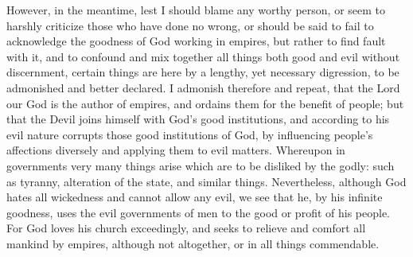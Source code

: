 However, in the meantime, lest I should blame any worthy person, or seem to harshly criticize those who have done no wrong, or should be said to fail to acknowledge the goodness of God working in empires, but rather to find fault with it, and to confound and mix together all things both good and evil without discernment, certain things are here by a lengthy, yet necessary digression, to be admonished and better declared. I admonish therefore and repeat, that the Lord our God is the author of empires, and ordains them for the benefit of people; but that the Devil joins himself with God’s good institutions, and according to his evil nature corrupts those good institutions of God, by influencing people’s affections diversely and applying them to evil matters. Whereupon in governments very many things arise which are to be disliked by the godly: such as tyranny, alteration of the state, and similar things. Nevertheless, although God hates all wickedness and cannot allow any evil, we see that he, by his infinite goodness, uses the evil governments of men to the good or profit of his people. For God loves his church exceedingly, and seeks to relieve and comfort all mankind by empires, although not altogether, or in all things commendable.

